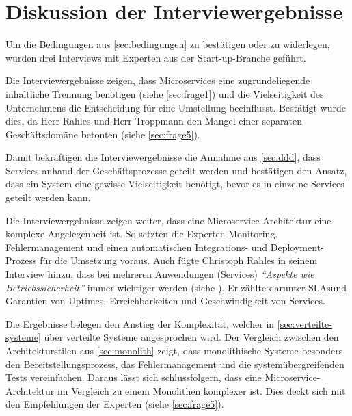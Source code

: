\section{Diskussion der Interviewergebnisse}
\label{sec:auswertung}

Um die Bedingungen aus \cref{sec:bedingungen} zu bestätigen oder zu widerlegen, wurden drei Interviews mit Experten aus der Start-up-Branche geführt.

Die Interviewergebnisse zeigen, dass Microservices eine zugrundeliegende inhaltliche Trennung benötigen (siehe \cref{sec:frage1}) und die Vielseitigkeit des Unternehmens die Entscheidung für eine Umstellung beeinflusst. Bestätigt wurde dies, da Herr Rahles und Herr Troppmann den Mangel einer separaten Geschäftsdomäne betonten (siehe \cref{sec:frage5}).

\label{sec:vielseitigkeit}
Damit bekräftigen die Interviewergebnisse die Annahme aus \cref{sec:ddd}, dass Services anhand der Geschäftsprozesse geteilt werden und bestätigen den Ansatz, dass ein System eine gewisse Vielseitigkeit benötigt, bevor es in einzelne Services geteilt werden kann.

Die Interviewergebnisse zeigen weiter, dass eine Microservice-Architektur eine komplexe Angelegenheit ist. So setzten die Experten Monitoring, Fehlermanagement und einen automatischen Integrations- und Deployment-Prozess für die Umsetzung voraus.
Auch fügte Christoph Rahles in seinem Interview hinzu, dass bei mehreren Anwendungen (Services) \textit{\enquote{Aspekte wie Betriebssicherheit}} immer wichtiger werden (siehe ). Er zählte darunter SLAs\footnotemark und Garantien von Uptimes, Erreichbarkeiten und Geschwindigkeit von Services.


Die Ergebnisse belegen den Anstieg der Komplexität, welcher in \cref{sec:verteilte-systeme} über verteilte Systeme angesprochen wird. Der Vergleich zwischen den Architekturstilen aus \cref{sec:monolith} zeigt, dass monolithische Systeme besonders den Bereitstellungsprozess, das Fehlermanagement und die systemübergreifenden Tests vereinfachen. Daraus lässt sich schlussfolgern, dass eine Microservice-Architektur im Vergleich zu einem Monolithen komplexer ist. Dies deckt sich mit den Empfehlungen der Experten (siehe \cref{sec:frage5}).

